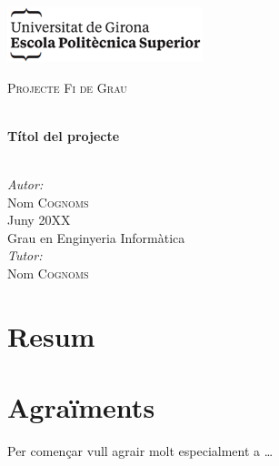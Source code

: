 \documentclass[a4paper,12pt,twoside]{ThesisStyle}
\begin{document}
\begin{titlepage}

\includegraphics[scale=0.9]{imatges/logo_eps.png} \\[1cm]
\begin{center}
\textsc{\Large Projecte Fi de Grau} \\[1cm]

\begin{spacing}{2}
\HRule \\
\textbf{\Huge Títol del projecte} \\
\HRule \\[0.5cm]
\end{spacing}

{
\large
\emph{Autor:} \\
Nom \textsc{Cognoms} \\[1cm]
Juny 20XX \\[1cm]
Grau en Enginyeria Informàtica \\[1cm]
\emph{Tutor:} \\
Nom \textsc{Cognoms} \\
}

\end{center}
\end{titlepage}

\titlepage

\dominitoc


\chapter*{Resum}
\label{chp:resum}



\chapter*{Agraïments}
\label{chp:agraiments}

Per començar vull agrair molt especialment a \ldots


\tableofcontents

\listoffigures

\listoftables

\mainmatter
\end{document}
